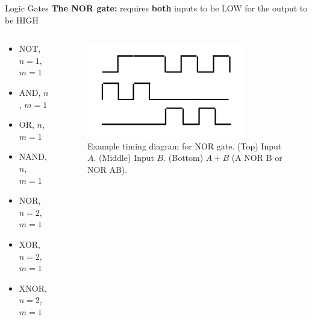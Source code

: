 \documentclass{beamer}
\begin{document}
\begin{frame}{Logic Gates}
\textbf{The NOR gate:} requires \textbf{both} inputs to be LOW for the output to be HIGH \\ \vspace{0.5cm}
\begin{columns}[T]
\begin{column}{0.5\textwidth}
\begin{itemize}
\item \alert{NOT, $n=1$, $m=1$}
\item \alert{AND, $n$, $m=1$}
\item \alert{OR, $n$, $m=1$}
\item \alert{NAND, $n$, $m=1$}
\item \alert{NOR, $n=2$, $m=1$}
\item XOR, $n=2$, $m=1$
\item XNOR, $n=2$, $m=1$
\end{itemize}
\end{column}
\begin{column}{0.5\textwidth}
\begin{figure}
\centering
\includegraphics[width=0.8\textwidth]{figures/TimingNor.pdf}
\caption{\label{fig:nor2} Example timing diagram for NOR gate.  (Top) Input $A$.  (Middle) Input $B$. (Bottom) $\overline{A+B}$ (A NOR B or NOR AB).}
\end{figure}
\end{column}
\end{columns}
\end{frame}
\end{document}
